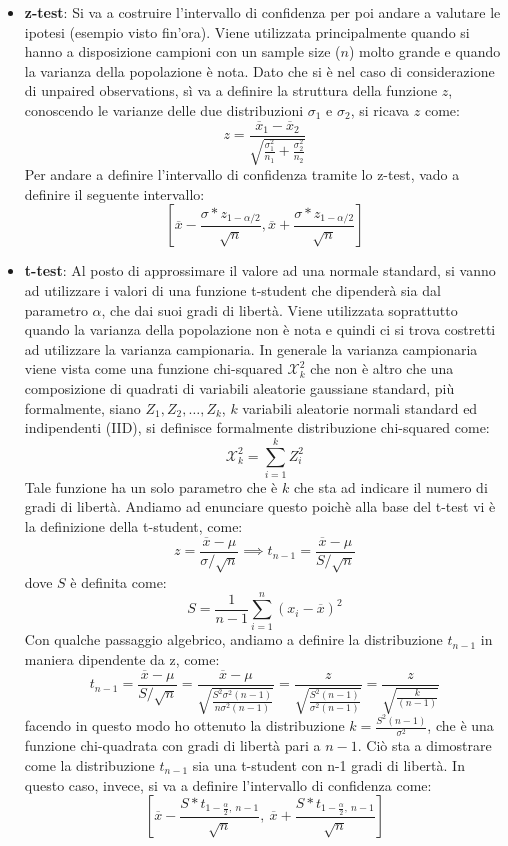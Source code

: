 \begin{itemize}
    \item \textbf{z-test}: Si va a costruire l'intervallo di confidenza per poi andare a valutare le ipotesi (esempio visto fin'ora). Viene utilizzata principalmente quando si hanno a disposizione campioni con un sample size (\(n\)) molto grande e quando la varianza della popolazione è nota. Dato che si è nel caso di considerazione di unpaired observations, sì va a definire la struttura della funzione \(z\), conoscendo le varianze delle due distribuzioni \(\sigma_1\) e \(\sigma_2\), si ricava \(z\) come:
    \[
    z = \frac{\overline{x}_1 - \overline{x}_2}{\sqrt{\frac{\sigma_1^2}{n_1} + \frac{\sigma_2^2}{n_2}}}
    \]
    Per andare a definire l'intervallo di confidenza tramite lo z-test, vado a definire il seguente intervallo:
    \[
    \left [ \overline{x} - \frac{\sigma * z_{1-\alpha/2}}{\sqrt{n}}, \overline{x} + \frac{\sigma * z_{1-\alpha/2}}{\sqrt{n}} \right ]
    \]

    \item \textbf{t-test}: Al posto di approssimare il valore ad una normale standard, si vanno ad utilizzare i valori di una funzione t-student che dipenderà sia dal parametro \(\alpha\), che dai suoi gradi di libertà. Viene utilizzata soprattutto quando la varianza della popolazione non è nota e quindi ci si trova costretti ad utilizzare la varianza campionaria. In generale la varianza campionaria viene vista come una funzione chi-squared \(\mathcal{X}^2_k\) che non è altro che una composizione di quadrati di variabili aleatorie gaussiane standard, più formalmente, siano \(Z_1, Z_2, \dots, Z_k\), \(k\) variabili aleatorie normali standard ed indipendenti (IID), si definisce formalmente distribuzione chi-squared come:
    \[
    \mathcal{X}^2_k = \sum_{i=1}^{k}Z_i^2
    \]
    Tale funzione ha un solo parametro che è \(k\) che sta ad indicare il numero di gradi di libertà.
    Andiamo ad enunciare questo poichè alla base del t-test vi è la definizione della t-student, come:
    \[
    z = \frac{\overline{x} - \mu}{\sigma/\sqrt{n}} \implies t_{n-1} = \frac{\overline{x} - \mu}{S/\sqrt{n}}
    \]
    dove \(S\) è definita come:
    \[
    S = \frac{1}{n-1}\sum_{i=1}^{n}(x_i - \overline{x})^2
    \]
    Con qualche passaggio algebrico, andiamo a definire la distribuzione \(t_{n-1}\) in maniera dipendente da z, come:
    \[
    t_{n-1} = \frac{\overline{x} - \mu}{S/\sqrt{n}} = \frac{\overline{x} - \mu}{\sqrt{\frac{S^2 \sigma^2 (n-1)}{n \sigma^2 (n-1)}}} = \frac{z}{\sqrt{\frac{S^2(n-1)}{\sigma^2 (n-1)}}} = \frac{z}{\sqrt{\frac{k}{(n-1)}}}
    \]
    facendo in questo modo ho ottenuto la distribuzione \(k = \frac{S^2 (n-1)}{\sigma^2}\), che è una funzione chi-quadrata con gradi di libertà pari a \(n-1\). Ciò sta a dimostrare come la distribuzione \(t_{n-1}\) sia una t-student con n-1 gradi di libertà. In questo caso, invece, si va a definire l'intervallo di confidenza come:
    \[
    \left [ \overline{x} - \frac{S * t_{1-\frac{\alpha}{2},\ n-1}}{\sqrt{n}},\ \overline{x} + \frac{S * t_{1-\frac{\alpha}{2},\ n-1}}{\sqrt{n}} \right ]
    \]
\end{itemize}

